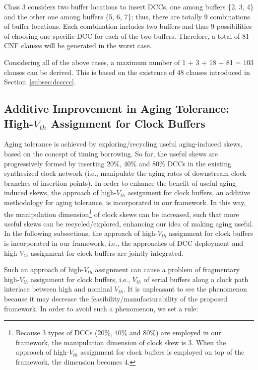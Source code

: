 Class 3 considers two buffer locations to insert DCCs, one among buffers \{2, 3, 4\} and the other one among buffers \{5, 6, 7\}; thus, there are totally 9 combinations of buffer locations. Each combination includes two buffers and thus 9 possibilities of choosing one specific DCC for each of the two buffers. Therefore, a total of 81 CNF clauses will be generated in the worst case.

Considering all of the above cases, a maximum number of 1 + 3 + 18 + 81 = 103 clauses can be derived. This is based on the existence of 48 clauses introduced in Section~\ref{subsec:dccccc}.


\subsection{Additive Improvement in Aging Tolerance: High-$V_{th}$ Assignment for Clock Buffers}
\label{sec:VTA}
Aging tolerance is achieved by exploring/recycling useful aging-induced skews, based on the concept of timing borrowing. So far, the useful skews are progressively formed by inserting 20\%, 40\% and 80\% DCCs in the existing synthesized clock network (i.e., manipulate the aging rates of downstream clock branches of insertion points). In order to enhance the benefit of useful aging-induced skews, the approach of high-$V_{th}$ assignment for clock buffers, an additive methodology for aging tolerance, is incorporated in our framework. In this way, the manipulation dimension\footnote[8]{Because 3 types of DCCs (20\%, 40\% and 80\%) are employed in our framework, the manipulation dimension of clock skew is 3. When the approach of high-$V_{th}$ assignment for clock buffers is employed on top of the framework, the dimension becomes 4.} of clock skews can be increased, such that more useful skews can be recycled/explored, enhancing our idea of making aging useful. In the following subsections, the approach of high-$V_{th}$ assignment for clock buffers is incorporated in our framework, i.e., the approaches of DCC deployment and high-$V_{th}$ assignment for clock buffers are jointly integrated.

Such an approach of high-$V_{th}$ assignment can cause a problem of fragmentary high-$V_{th}$ assignment for clock buffers, i.e., $V_{th}$ of serial buffers along a clock path interlace between high and nominal $V_{th}$. It is unpleasant to see the phenomenon because it may decrease the feasibility/manufacturability of the proposed framework. In order to avoid such a phenomenon, we set a rule:

